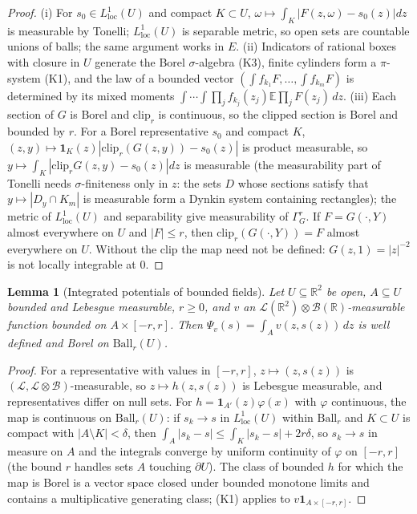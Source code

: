 \documentclass[11pt]{article}
\theoremstyle{plain}
\newtheorem{lemma}[theorem]{Lemma}
\theoremstyle{definition}
\theoremstyle{remark}
\newcommand{\R}{\mathbb{R}}
\newcommand{\E}{\mathbb{E}}
\newcommand{\cB}{\mathcal{B}}
\newcommand{\cL}{\mathcal{L}}
\newcommand{\ind}{\mathbf{1}}
\newcommand{\Ball}{\mathrm{Ball}}
\newcommand{\clip}{\mathrm{clip}}
\begin{document}
\begin{proof}
(i) For $s_0\in L^{1}_{\mathrm{loc}}(U)$ and compact $K\subset U$,
$\omega\mapsto\int_K|F(z,\omega)-s_0(z)|dz$ is measurable by Tonelli; $L^{1}_{\mathrm{loc}}(U)$ is separable
metric, so open sets are countable unions of balls; the same argument works in
$E$. (ii) Indicators of rational boxes with closure in $U$ generate the Borel
$\sigma$-algebra (K3), finite cylinders form a $\pi$-system (K1), and the law of a bounded
vector $(\int f_{k_1}F,\dots,\int f_{k_m}F)$ is determined by its mixed moments
$\int\cdots\int\prod_jf_{k_j}(z_j)\E\prod_jF(z_j)\,dz$. (iii) Each section of $G$ is Borel and
$\clip_r$ is continuous, so the clipped section is Borel and bounded by $r$. For a
Borel representative $s_0$ and compact $K$, $(z,y)\mapsto\ind_K(z)|\clip_r(G(z,y))-s_0(z)|$ is
product measurable, so $y\mapsto\int_K|\clip_rG(z,y)-s_0(z)|dz$ is measurable (the measurability
part of Tonelli needs $\sigma$-finiteness only in $z$: the sets $D$ whose sections
satisfy that $y\mapsto|D_y\cap K_m|$ is measurable form a Dynkin system containing
rectangles); the metric of $L^{1}_{\mathrm{loc}}(U)$ and separability give measurability of
$\Gamma^{r}_{G}$. If $F=G(\cdot,Y)$ almost everywhere on $U$ and $|F|\le r$, then
$\clip_r(G(\cdot,Y))=F$ almost everywhere on $U$. Without the clip the map need not
be defined: $G(z,1)=|z|^{-2}$ is not locally integrable at $0$.
\end{proof}

\begin{lemma}[Integrated potentials of bounded fields]\label{lem:E-potential}
Let $U\subseteq\R^{2}$ be open, $A\subseteq U$ bounded and Lebesgue measurable, $r\ge0$, and
$v$ an $\cL(\R^{2})\otimes\cB(\R)$-measurable function bounded on $A\times[-r,r]$. Then
$\Psi_v(s)=\int_Av(z,s(z))\,dz$ is well defined and Borel on $\Ball_r(U)$.
\end{lemma}

\begin{proof}
For a representative with values in $[-r,r]$, $z\mapsto(z,s(z))$ is
$(\cL,\cL\otimes\cB)$-measurable, so $z\mapsto h(z,s(z))$ is Lebesgue measurable, and
representatives differ on null sets. For $h=\ind_{A'}(z)\varphi(x)$ with $\varphi$
continuous, the map is continuous on $\Ball_r(U)$: if $s_k\to s$ in $L^{1}_{\mathrm{loc}}(U)$
within $\Ball_r$ and $K\subset U$ is compact with $|A\setminus K|<\delta$, then
$\int_A|s_k-s|\le\int_K|s_k-s|+2r\delta$, so $s_k\to s$ in measure on $A$ and the integrals
converge by uniform continuity of $\varphi$ on $[-r,r]$ (the bound $r$ handles sets
$A$ touching $\partial U$). The class of bounded $h$ for which the map is Borel is a
vector space closed under bounded monotone limits and contains a
multiplicative generating class; (K1) applies to $v\ind_{A\times[-r,r]}$.
\end{proof}
\end{document}
